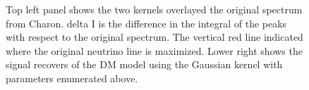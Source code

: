 \begin{figure}[h]
    \caption{Top left panel shows the two kernels overlayed the original spectrum from Charon. delta I is the difference in the integral of the peaks with respect to the original spectrum. The vertical red line indicated where the original neutrino line is maximized. Lower right shows the signal recovers of the DM model using the Gaussian kernel with parameters enumerated above.} \label{fig:icDM_fixed_line}
\end{figure}

